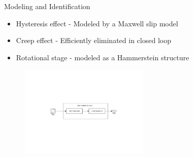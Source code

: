 \documentclass[10pt]{beamer}
\begin{document}
\begin{frame}{Modeling and Identification}
  \begin{itemize}
    \item \alert{Hysteresis effect} - Modeled by a Maxwell slip model
    \item \alert{Creep effect} - Efficiently eliminated in closed loop
    \item \alert{Rotational stage} - modeled as a Hammerstein structure
  \end{itemize}

  \begin{figure}[h]
    \centering %
    \includegraphics[width=0.55\textwidth, trim=8cm 8cm 7.73cm 8cm, clip=true]{../fig/matlab/hammerstein}
  \end{figure}
  \vspace{-1cm}


\end{frame}
\end{document}
